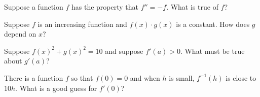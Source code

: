 \documentclass{ximera}
\newcommand{\recommendation}[1]{}
\begin{document}
\begin{problem}
  Suppose a function $f$ has the property that $f'' = -f$.  What is true of $f$?
  \begin{multipleChoice}
  \end{multipleChoice}
\end{problem}



\begin{problem}
  Suppose $f$ is an increasing function and $f(x) \cdot g(x)$ is a constant.  How does $g$ depend on $x$?
  \begin{multipleChoice}
  \end{multipleChoice}
\end{problem}

\begin{problem}
\recommendation{Vic}
  Suppose $f(x)^2 + g(x)^2 = 10$ and suppose $f'(a) > 0$.  What must be true about $g'(a)$?
  \begin{multipleChoice}
  \end{multipleChoice}
\end{problem}



\begin{problem}
\recommendation{Vic}
  There is a function $f$ so that $f(0) = 0$ and when $h$ is small, $f^{-1}(h)$ is close to $10 h$.  What is a good guess for $f'(0)$?
  \begin{multipleChoice}
  \end{multipleChoice}
\end{problem}
\end{document}
